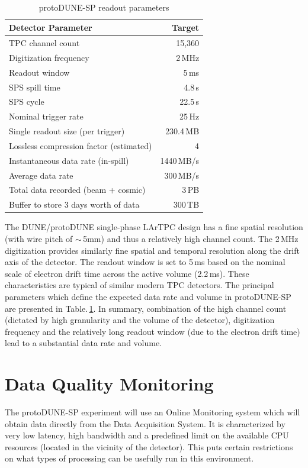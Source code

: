 \documentclass{PoS}
\newcommand{\pd}{protoDUNE\xspace}
\begin{document}
\begin{table}
\begin{center}
\caption{\label{table:np04_data_rate}
  protoDUNE-SP readout parameters}
\ \\
\begin{tabularx}{0.75\textwidth}{ X  >{\setlength{\hsize}{0.8\hsize}}r}
\hline
Detector Parameter & Target \\
\hline
TPC channel count & 15,360 \\
Digitization frequency & 2\,MHz \\
Readout window & 5\,ms \\
SPS spill time& 4.8\,s\\
SPS cycle& 22.5\,s\\
Nominal trigger rate & 25\,Hz \\
Single readout size (per trigger) & 230.4\,MB \\
Lossless compression factor (estimated) & 4 \\
Instantaneous data rate (in-spill) & 1440\,MB/s \\
Average data rate & 300\,MB/s \\
Total data recorded (beam + cosmic) & 3\,PB\\
Buffer to store 3 days worth of data & 300\,TB\\
\hline
\end{tabularx}
\end{center}
\end{table}

The DUNE/\pd single-phase LArTPC design has a fine spatial resolution (with wire pitch of $\sim$\,5mm)
and thus a relatively high channel count. The 2\,MHz digitization provides similarly fine spatial and
temporal resolution along the drift axis of the detector. The readout window is  set to 5\,ms 
based on the nominal scale of electron drift time across the active volume (2.2\,ms).  These characteristics are typical of
similar modern TPC detectors. The principal parameters which define the expected data rate and
volume in protoDUNE-SP are presented  in Table.\,\ref{table:np04_data_rate}. In summary, combination
of the high channel count (dictated by high granularity and the volume of the detector), digitization frequency
and the relatively long readout window (due to the electron drift time) lead to a substantial data rate and volume.



\section{Data Quality Monitoring}
The protoDUNE-SP experiment will use an Online Monitoring system which will obtain data directly
from the Data Acquisition System. It is characterized by very low latency, high bandwidth and
a predefined limit on the available CPU resources (located in the vicinity of the detector). This
puts certain restrictions on what types of processing can be usefully run in this environment.
\end{document}
